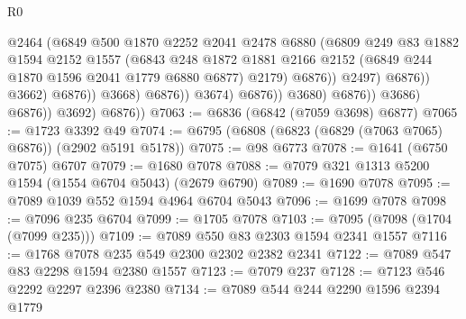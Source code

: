 \begin{lexlean}{R0}
\begin{coremodule}
                                              @2464
                                              (@6849
                                                @500
                                                @1870
                                                @2252
                                                @2041
                                                @2478
                                                @6880
                                                (@6809
                                                  @249
                                                  @83
                                                  @1882
                                                  @1594
                                                  @2152
                                                  @1557
                                                  (@6843
                                                    @248
                                                    @1872
                                                    @1881
                                                    @2166
                                                    @2152
                                                    (@6849 @244 @1870 @1596 @2041 @1779 @6880 @6877)
                                                    @2179)
                                                  @6876))
                                              @2497)
                                            @6876))
                                        @3662)
                                      @6876))
                                  @3668)
                                @6876))
                            @3674)
                          @6876))
                      @3680)
                    @6876))
                @3686)
              @6876))
          @3692)
        @6876))
@7063 := @6836 (@6842 (@7059 @3698) @6877)
@7065 := @1723 @3392 @49
@7074 := @6795 (@6808 (@6823 (@6829 (@7063 @7065) @6876)) (@2902 @5191 @5178))
@7075 := @98 @6773
@7078 := @1641 (@6750 @7075) @6707
@7079 := @1680 @7078
@7088 := @7079 @321 @1313 @5200 @1594 (@1554 @6704 @5043) (@2679 @6790)
@7089 := @1690 @7078
@7095 := @7089 @1039 @552 @1594 @4964 @6704 @5043
@7096 := @1699 @7078
@7098 := @7096 @235 @6704
@7099 := @1705 @7078
@7103 := @7095 (@7098 (@1704 (@7099 @235)))
@7109 := @7089 @550 @83 @2303 @1594 @2341 @1557
@7116 := @1768 @7078 @235 @549 @2300 @2302 @2382 @2341
@7122 := @7089 @547 @83 @2298 @1594 @2380 @1557
@7123 := @7079 @237
@7128 := @7123 @546 @2292 @2297 @2396 @2380
@7134 := @7089 @544 @244 @2290 @1596 @2394 @1779

\end{coremodule}
\end{lexlean}
